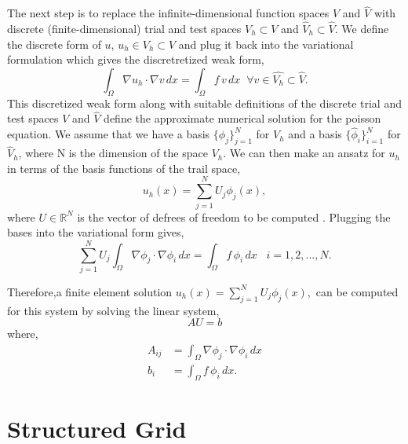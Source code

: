 The next step is to replace the infinite-dimensional function spaces $V$ and $\hat{V}$ with discrete (finite-dimensional) trial and test spaces $V_h \subset V$ and $\hat{V}_h \subset \hat{V}$.  We define the discrete form of $u$, $u_h \in V_h \subset V$ and plug it back into the variational formulation which gives the discretretized weak form,
\begin{equation}
\int_{\Omega} \nabla u_h \cdot \nabla v \, dx = \int_{\Omega} f \, v \, dx \;\; \forall v \in \hat{V_h} \subset \hat{V}.
\end{equation}
This discretized weak form along with suitable definitions of the discrete trial and test spaces $V$ and $\hat{V}$ define the approximate numerical solution for the poisson equation.  We assume that we have a basis $\lbrace \phi_j \rbrace^N_{j=1}$ for $V_h$ and a basis $\lbrace \hat{\phi}_i\rbrace^N_{i=1}$ for $\hat{V}_h$, where N is the dimension of the space $V_h$.  We can then make an ansatz for $u_h$ in terms of the basis functions of the trail space,
\begin{equation}
u_h (x) = \sum^N_{j=1} U_j \phi_j(x),
\label{ansatz}
\end{equation}
where $U \in \mathbb{R}^N$ is the vector of defrees of freedom to be computed \cite{AutomatedFEM2011}.  Plugging the bases into the variational form gives,
\begin{equation}
\sum^N_{j=1} U_j \int_{\Omega} \nabla \phi_j \cdot \nabla \phi_i \, dx  = \int_{\Omega} f \, \phi_i \, dx \;\;\; i = 1,2,...,N.
\end{equation}

Therefore,a finite element solution $u_h (x) = \sum^N_{j=1} U_j \phi_j(x),$ can be computed for this system by solving the linear system,
\begin{equation}
A U = b
\end{equation}
where,
\begin{align}
A_{ij} &= \int_{\Omega} \nabla \phi_j \cdot \nabla \phi_i \, dx \\
b_i &= \int_{\Omega} f \, \phi_i \, dx.
\end{align}

\section{Structured Grid}

